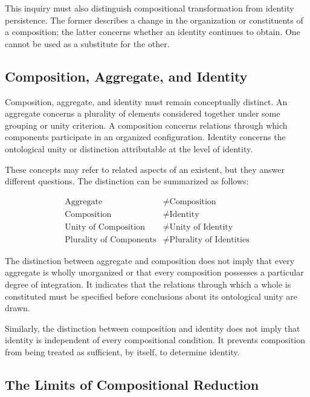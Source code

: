 This inquiry must also distinguish compositional
transformation from identity persistence. The former
describes a change in the organization or constituents
of a composition; the latter concerns whether an identity
continues to obtain. One cannot be used as a substitute
for the other.

\subsection{Composition, Aggregate, and Identity}

Composition, aggregate, and identity must remain
conceptually distinct. An aggregate concerns a plurality
of elements considered together under some grouping
or unity criterion. A composition concerns relations
through which components participate in an organized
configuration. Identity concerns the ontological unity
or distinction attributable at the level of identity.

These concepts may refer to related aspects of an
existent, but they answer different questions. The
distinction can be summarized as follows:

\[
\begin{aligned}
\text{Aggregate} &\neq \text{Composition}
\\
\text{Composition} &\neq \text{Identity}
\\
\text{Unity of Composition} &\neq \text{Unity of Identity}
\\
\text{Plurality of Components} &\neq
\text{Plurality of Identities}
\end{aligned}
\]

The distinction between aggregate and composition
does not imply that every aggregate is wholly unorganized
or that every composition possesses a particular degree
of integration. It indicates that the relations through
which a whole is constituted must be specified before
conclusions about its ontological unity are drawn.

Similarly, the distinction between composition and
identity does not imply that identity is independent
of every compositional condition. It prevents composition
from being treated as sufficient, by itself, to determine
identity.

\subsection{The Limits of Compositional Reduction}

